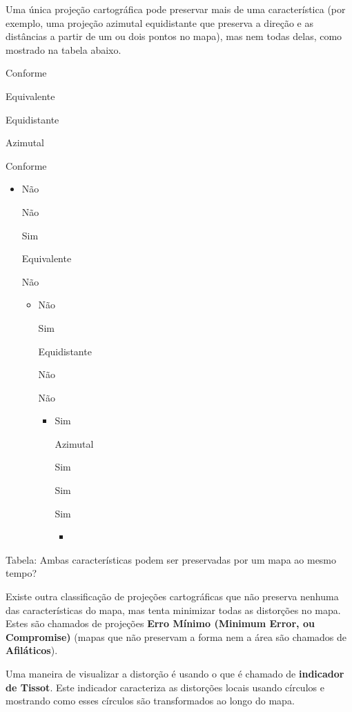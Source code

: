 \documentclass[
]{book}
\providecommand{\tightlist}{%
  \setlength{\itemsep}{0pt}\setlength{\parskip}{0pt}}
\begin{document}
Uma única projeção cartográfica pode preservar mais de uma característica (por exemplo, uma projeção azimutal equidistante que preserva a direção e as distâncias a partir de um ou dois pontos no mapa), mas nem todas delas, como mostrado na tabela abaixo.

Conforme

Equivalente

Equidistante

Azimutal

Conforme

\begin{itemize}
\item
  Não

  Não

  Sim

  Equivalente

  Não

  \begin{itemize}
  \item
    Não

    Sim

    Equidistante

    Não

    Não

    \begin{itemize}
    \item
      Sim

      Azimutal

      Sim

      Sim

      Sim

      \begin{itemize}
      \tightlist
      \item
      \end{itemize}
    \end{itemize}
  \end{itemize}
\end{itemize}

Tabela: Ambas características podem ser preservadas por um mapa ao mesmo tempo?

Existe outra classificação de projeções cartográficas que não preserva nenhuma das características do mapa, mas tenta minimizar todas as distorções no mapa. Estes são chamados de projeções \textbf{Erro Mínimo (Minimum Error, ou Compromise)} (mapas que não preservam a forma nem a área são chamados de \textbf{Afiláticos}).

Uma maneira de visualizar a distorção é usando o que é chamado de \textbf{indicador de Tissot}. Este indicador caracteriza as distorções locais usando círculos e mostrando como esses círculos são transformados ao longo do mapa.
\end{document}
